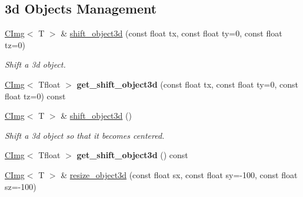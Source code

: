 \subsection*{3d Objects Management}
\label{_amgrp29e7302650cee0232169d29fd6936a8a}
 \begin{DoxyCompactItemize}
\item 
\hypertarget{structcimg__library_1_1CImg_a391187a64211103d308779902fad8e3b}{
\hyperlink{structcimg__library_1_1CImg}{CImg}$<$ T $>$ \& \hyperlink{structcimg__library_1_1CImg_a391187a64211103d308779902fad8e3b}{shift\_\-object3d} (const float tx, const float ty=0, const float tz=0)}
\label{structcimg__library_1_1CImg_a391187a64211103d308779902fad8e3b}

\begin{DoxyCompactList}\small\item\em Shift a 3d object. \item\end{DoxyCompactList}\item 
\hypertarget{structcimg__library_1_1CImg_a93c9931e74f0f8b1b8e2eae8a3949e55}{
\hyperlink{structcimg__library_1_1CImg}{CImg}$<$ Tfloat $>$ {\bfseries get\_\-shift\_\-object3d} (const float tx, const float ty=0, const float tz=0) const }
\label{structcimg__library_1_1CImg_a93c9931e74f0f8b1b8e2eae8a3949e55}

\item 
\hypertarget{structcimg__library_1_1CImg_af2c897968a61087f41383ad01c510b81}{
\hyperlink{structcimg__library_1_1CImg}{CImg}$<$ T $>$ \& \hyperlink{structcimg__library_1_1CImg_af2c897968a61087f41383ad01c510b81}{shift\_\-object3d} ()}
\label{structcimg__library_1_1CImg_af2c897968a61087f41383ad01c510b81}

\begin{DoxyCompactList}\small\item\em Shift a 3d object so that it becomes centered. \item\end{DoxyCompactList}\item 
\hypertarget{structcimg__library_1_1CImg_aaa447213ae37158aebdc8490c8430456}{
\hyperlink{structcimg__library_1_1CImg}{CImg}$<$ Tfloat $>$ {\bfseries get\_\-shift\_\-object3d} () const }
\label{structcimg__library_1_1CImg_aaa447213ae37158aebdc8490c8430456}

\item 
\hypertarget{structcimg__library_1_1CImg_acf489c894d7f7394912d5dd4c05c1538}{
\hyperlink{structcimg__library_1_1CImg}{CImg}$<$ T $>$ \& \hyperlink{structcimg__library_1_1CImg_acf489c894d7f7394912d5dd4c05c1538}{resize\_\-object3d} (const float sx, const float sy=-\/100, const float sz=-\/100)}
\label{structcimg__library_1_1CImg_acf489c894d7f7394912d5dd4c05c1538}


\end{DoxyCompactItemize}
